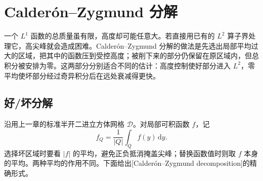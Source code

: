 \section{Calderón–Zygmund 分解}
\label{b2:sec:1802}

一个 \(L^1\) 函数的总质量虽有限，高度却可能任意大。若直接用已有的 \(L^2\) 算子界处理它，高尖峰就会造成困难。Calderón--Zygmund 分解的做法是先选出局部平均过大的区域，把其中的函数压到受控高度；被削下来的部分仍保留在原区域内，但总积分被安排为零。这两部分分别适合不同的估计：高度控制使好部分进入 \(L^2\)，零平均使坏部分经过奇异积分后在远处衰减得更快。

\subsection{好/坏分解}
\label{b2:subsec:180201}

沿用上一章的标准半开二进立方体网格 \(\mathcal D\)。对局部可积函数 \(f\)，记
\[
 f_Q=\frac1{|Q|}\int_Q f(y)\,\mathrm dy.
\]
选择坏区域时要看 \(|f|\) 的平均，避免正负抵消掩盖尖峰；替换函数值时则取 \(f\) 本身的平均。两种平均的作用不同。下面给出[Calderón--Zygmund decomposition]的精确形式。

